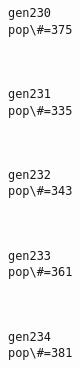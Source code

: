 \documentclass[11pt]{article}
\begin{document}
    \begin{Verbatim}[commandchars=\\\{\}]
gen230
pop\#=375

    \end{Verbatim}

    \begin{center}
    \end{center}
    { \hspace*{\fill} \\}
    
    \begin{Verbatim}[commandchars=\\\{\}]
gen231
pop\#=335

    \end{Verbatim}

    \begin{center}
    \end{center}
    { \hspace*{\fill} \\}
    
    \begin{Verbatim}[commandchars=\\\{\}]
gen232
pop\#=343

    \end{Verbatim}

    \begin{center}
    \end{center}
    { \hspace*{\fill} \\}
    
    \begin{Verbatim}[commandchars=\\\{\}]
gen233
pop\#=361

    \end{Verbatim}

    \begin{center}
    \end{center}
    { \hspace*{\fill} \\}
    
    \begin{Verbatim}[commandchars=\\\{\}]
gen234
pop\#=381

    \end{Verbatim}
\end{document}

